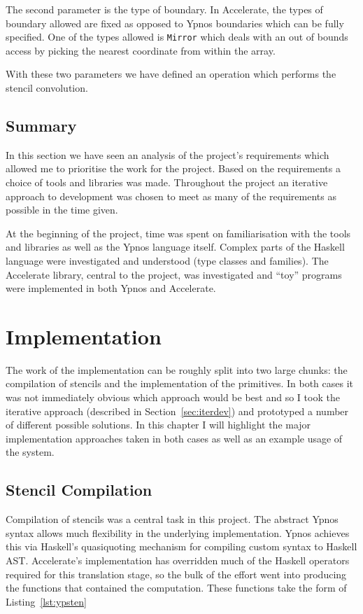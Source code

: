 \documentclass[12pt,a4paper,twoside]{scrbook}
\begin{document}
The second parameter is the type of boundary. In Accelerate, the types of
boundary allowed are fixed as opposed to Ypnos boundaries which can be fully
specified. One of the types allowed is \texttt{Mirror} which deals with an out
of bounds access by picking the nearest coordinate from within the array.

With these two parameters we have defined an operation which performs the
stencil convolution.


\section{Summary}

In this section we have seen an analysis of the project's requirements which
allowed me to prioritise the work for the project. Based on the requirements a
choice of tools and libraries was made. Throughout the project an iterative
approach to development was chosen to meet as many of the requirements as
possible in the time given.

At the beginning of the project, time was spent on familiarisation with the
tools and libraries as well as the Ypnos language itself. Complex parts of the
Haskell language were investigated and understood (type classes and
families). The Accelerate library, central to the project, was investigated and
``toy'' programs were implemented in both Ypnos and Accelerate.

\chapter{Implementation}
\label{sec:impl}

The work of the implementation can be roughly split into two large chunks: the
compilation of stencils and the implementation of the primitives. In both cases
it was not immediately obvious which approach would be best and so I took the
iterative approach (described in Section~\ref{sec:iterdev}) and prototyped a
number of different possible solutions. In this chapter I will highlight the
major implementation approaches taken in both cases as well as an example usage
of the system.

\section{Stencil Compilation}

Compilation of stencils was a central task in this project. The abstract Ypnos
syntax allows much flexibility in the underlying implementation.  Ypnos achieves
this via Haskell's quasiquoting mechanism\cite{} for compiling custom syntax to
Haskell AST. Accelerate's implementation has overridden much of the Haskell
operators required for this translation stage, so the bulk of the effort went
into producing the functions that contained the computation. These functions
take the form of Listing~\ref{lst:ypsten}
\end{document}
